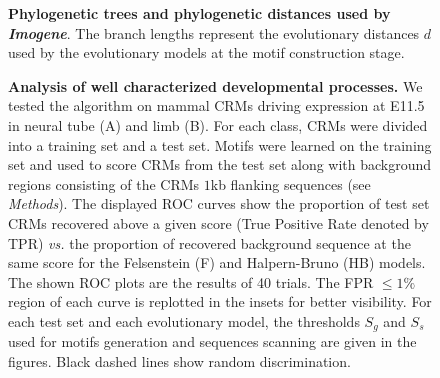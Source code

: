 \documentclass[a4,center,fleqn]{NAR}
\begin{document}
\begin{figure}[!htbp]
\begin{center}
\end{center}
\caption{{\bf Phylogenetic trees and  phylogenetic distances used by {\em
    Imogene}}.
    The branch lengths represent the evolutionary distances $d$ used by the
evolutionary models at the motif construction stage.}
  \label{fig:tree}
\end{figure}

\begin{figure}[!htbp]
\begin{center}
\end{center}
\caption{ 
    {\bf Analysis of well characterized developmental processes.}   	
    We tested the algorithm on mammal CRMs driving expression at E11.5 in
    neural tube (A) and limb (B). 
    For each class, CRMs were divided into a training set and a test set. 
    Motifs were learned on the training set and used to
    score CRMs from the test set along with background regions 
    consisting of the CRMs $1$kb flanking sequences (see { \em Methods}). 
    The displayed ROC curves show the proportion of test set CRMs recovered
    above a given score (True Positive Rate denoted by TPR) {\em vs.}
    the proportion of  recovered background sequence at the same score for the
    Felsenstein (F) and Halpern-Bruno (HB) models.
    The shown ROC plots are the results of 40 trials.
    The FPR $\leq1\%$ region of each curve is replotted in the insets for
    better visibility.
    For each test set and each evolutionary model, the thresholds $S_g$ and
    $S_s$ used for motifs generation and sequences scanning are given in the
    figures.
    Black dashed lines show random discrimination.  }
    \label{fig:mamtrain}
\end{figure}
\end{document}
